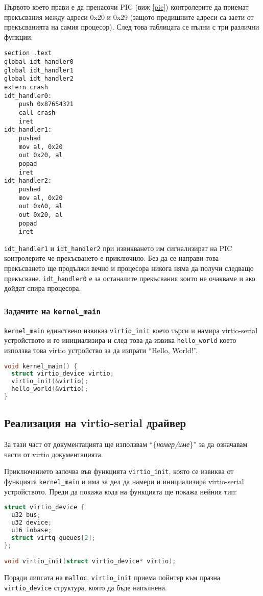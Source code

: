 Първото което прави е да пренасочи PIC (виж \ref{pic}) контролерите да приемат прекъсвания между адреси 0x20 и 0x29 (защото предишните адреси са заети от прекъсванията на самия процесор). След това таблицата се пълни с три различни функции:
\begin{lstlisting}
section .text
global idt_handler0
global idt_handler1
global idt_handler2
extern crash
idt_handler0:
    push 0x87654321
    call crash
    iret
idt_handler1:
    pushad
    mov al, 0x20
    out 0x20, al
    popad
    iret
idt_handler2:
    pushad
    mov al, 0x20
    out 0xA0, al
    out 0x20, al
    popad
    iret
\end{lstlisting}
{\tt idt\_handler1} и {\tt idt\_handler2} при извикването им сигнализират на PIC контролерите че прекъсването е приключило. Без да се направи това прекъсването ще продължи вечно и процесора никога няма да получи следващо прекъсване. {\tt idt\_handler0} е за останалите прекъсвания които не очакваме и ако дойдат спира процесора.

\subsubsection{Задачите на {\tt kernel\_main}}
{\tt kernel\_main} единствено извиква {\tt virtio\_init} което търси и намира virtio-serial устройството и го инициализира и след това да извика {\tt hello\_world} което използва това virtio устройство за да изпрати ``Hello, World!''.
\begin{lstlisting}[language=C]
void kernel_main() {
  struct virtio_device virtio;
  virtio_init(&virtio);
  hello_world(&virtio);
}
\end{lstlisting}

\subsection{Реализация на virtio-serial драйвер}
За тази част от документацията ще използвам ``\{\textit{номер/име}\}'' за да означавам части от virtio документацията.\parencite{virtiodocs}

Приключението започва във функцията {\tt virtio\_init}, която се извиква от функцията {\tt kernel\_main} и има за дел да намери и инициализира virtio-serial устройството. Преди да покажа кода на функцията ще покажа нейния тип:
\begin{lstlisting}[language=C]
struct virtio_device {
  u32 bus;
  u32 device;
  u16 iobase;
  struct virtq queues[2];
};

void virtio_init(struct virtio_device* virtio);
\end{lstlisting}
Поради липсата на {\tt malloc}, {\tt virtio\_init} приема пойнтер към празна {\tt virtio\_device} структура, която да бъде напълнена.

